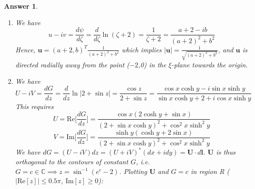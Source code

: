 \documentclass[a4paper]{article}
\newtheorem{ans}{Answer}[section]
\theoremstyle{new}
\begin{document}
\begin{ans}
\begin{enumerate}[label=(\alph*)]
\begin{enumerate}[label=(\roman*)]
\begin{center}
        \end{center}
Now, we want to find the point(s) in R where $G$ is not analytic.
$$G(z)=\psi(\zeta)=\ln(\zeta+2)=\ln(\sin z+2)$$
$G$ is not analytic at either $\sin z=\infty$ or
$$\sin z=\sin x\cosh y+i\cos x\sinh y=-2\implies y=0,~x=\pm\frac{\pi}{2}$$
but $\sin x\cosh0=-2$ has no solution, so only $x=\pm\frac{\pi}{2}$. There is only one solution to $\sin(\pm\frac{\pi}{2})\cosh(y)=-2$, which is $x=-\pi/2$, $y=\cosh^{-1}(2)=\pm\ln(2+\sqrt{2^2-1})=\pm\ln(2+\sqrt{3})$. But $y\geq0$ in region R, so $y=\ln(2+\sqrt{3})$. There is thus only one finite point in region R where $G$ is not analytic: $z=-\frac{\pi}{2}+i\ln(2+\sqrt{3})$.
\item We have
$$u-iv=\frac{d\psi}{d\zeta}=\frac{d}{d\zeta}\ln(\zeta+2)=\frac{1}{\zeta+2}=\frac{a+2-ib}{(a+2)^2+b^2}$$
Hence, $\mathbf{u}=(a+2,b)^T\frac{1}{(a+2)^2+b^2}$ which implies $|\mathbf{u}|=\frac{1}{\sqrt{(a+2)^2+b^2}}$, and $\mathbf{u}$ is directed radially away from the point ($-2$,0) in the $\xi$-plane towards the origin.
\item We have 
$$U-iV=\frac{dG}{dz}=\frac{d}{dz}\ln|2+\sin z|=\frac{\cos z}{2+\sin z}=\frac{\cos x\cosh y-i\sin x\sinh y}{\sin x \cosh y+2+i\cos x\sinh y}$$ This requires
$$U=\text{Re}\bigg[\frac{dG}{dz}\bigg]=\frac{\cos x(2\cosh y+\sin x)}{(2+\sin x\cosh y)^2+\cos^2x\sinh^2y}$$
$$V=\text{Im}\bigg[\frac{dG}{dz}\bigg]=\frac{\sinh y(\cosh y+2\sin x)}{(2+\sin x\cosh y)^2+\cos^2x\sinh^2y}$$
We have $dG=(U-iV)dz=(U+iV)^*(dx+idy)=\mathbf{U}\cdot d\mathbf{l}$. $\mathbf{U}$ is thus orthogonal to the contours of constant $G$, i.e. $G=c\in\mathbb{C}\implies z=\sin^{-1}(e^c-2)$. Plotting $\mathbf{U}$ and $G=c$ in region R ($|\text{Re}[z]|\leq 0.5\pi$, $\text{Im}[z]\geq 0$):

\end{enumerate}
\end{enumerate}
\end{ans}
\end{document}
